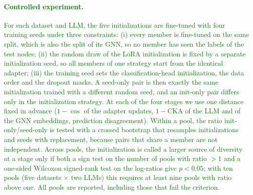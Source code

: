 \documentclass[a4paper,fleqn]{cas-sc}
\newcommand{\revthree}[1]{\textcolor{green}{#1}} %
\begin{document}
\paragraph{\revthree{Controlled experiment.}}
\revthree{For each dataset and LLM, the five initializations are fine-tuned with four training seeds under three constraints: (i) every member is fine-tuned on the same split, which is also the split of its GNN, so no member has seen the labels of the test nodes; (ii) the random draw of the LoRA initialization is fixed by a separate initialization seed, so all members of one strategy start from the identical adapter; (iii) the training seed sets the classification-head initialization, the data order and the dropout masks. A seed-only pair is then exactly the same initialization trained with a different random seed, and an init-only pair differs only in the initialization strategy. At each of the four stages we use one distance fixed in advance ($1-\cos$ of the adapter updates, $1-$CKA of the LLM and of the GNN embeddings, prediction disagreement). Within a pool, the ratio init-only/seed-only is tested with a crossed bootstrap that resamples initializations and seeds with replacement, because pairs that share a member are not independent. Across pools, the initialization is called a larger source of diversity at a stage only if both a sign test on the number of pools with ratio $>1$ and a one-sided Wilcoxon signed-rank test on the log-ratios give $p<0.05$; with ten pools (five datasets $\times$ two LLMs) this requires at least nine pools with ratio above one. All pools are reported, including those that fail the criterion.}
\end{document}

